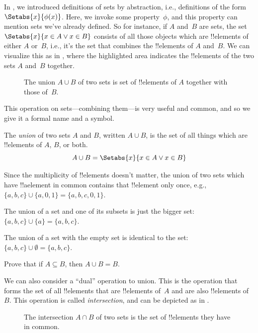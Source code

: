 \documentclass[../../../include/open-logic-section]{subfiles}
\begin{document}

\begin{explain}
In , we introduced definitions of sets by
abstraction, i.e., definitions of the form $\Setabs{x}{\phi(x)}$.
Here, we invoke some property~$\phi$, and this property can mention
sets we've already defined. So for instance, if $A$ and~$B$ are sets,
the set $\Setabs{x}{x \in A \lor x \in B}$ consists of all those
objects which are !!{element}s of either $A$ or~$B$, i.e., it's the
set that combines the !!{element}s of $A$ and~$B$. We can visualize
this as in , where the highlighted area indicates the
!!{element}s of the two sets $A$ and~$B$ together.

\begin{figure}
  \caption{The union $A \cup B$ of two sets is set of !!{element}s of
   $A$ together with those of~$B$.}
\end{figure}

This operation on sets---combining them---is very useful and common,
and so we give it a formal name and a symbol. 
\end{explain}

\begin{defn}[Union]
The \emph{union} of two sets $A$ and $B$, written $A \cup B$, is the
set of all things which are !!{element}s of $A$, $B$, or both.
\[
A \cup B = \Setabs{x}{x \in A \lor x \in B}
\]
\end{defn}

\begin{ex}
Since the multiplicity of !!{element}s doesn't matter, the union of two
sets which have !!a{element} in common contains that !!{element} only once,
e.g., $\{ a, b, c\} \cup \{ a, 0, 1\} = \{a, b, c, 0, 1\}$.

The union of a set and one of its subsets is just the bigger set: $\{a,
b, c \} \cup \{a \} = \{a, b, c\}$.

The union of a set with the empty set is identical to the set: $\{a,
b, c \} \cup \emptyset = \{a, b, c \}$.
\end{ex}

\begin{prob}
Prove that if $A \subseteq B$, then $A \cup B = B$.
\end{prob}

\begin{explain}
We can also consider a ``dual'' operation to union. This is the
operation that forms the set of all !!{element}s that are !!{element}s
of~$A$ and are also !!{element}s of~$B$. This operation is called 
\emph{intersection}, and can be depicted as in .
\begin{figure}
  \caption{The intersection $A \cap B$ of two sets is the set of
    !!{element}s they have in common.}
\end{figure}
\end{explain}
\end{document}
